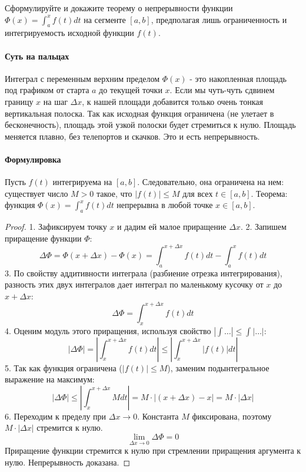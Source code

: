 
{Сформулируйте и докажите теорему о непрерывности функции $\Phi(x) = \int_a^x f(t)dt$ на сегменте $[a, b]$, предполагая лишь ограниченность и интегрируемость исходной функции $f(t)$.}

\paragraph{Суть на пальцах}
Интеграл с переменным верхним пределом $\Phi(x)$ - это накопленная площадь под графиком от старта $a$ до текущей точки $x$. Если мы чуть-чуть сдвинем границу $x$ на шаг $\Delta x$, к нашей площади добавится только очень тонкая вертикальная полоска. Так как исходная функция ограничена (не улетает в бесконечность), площадь этой узкой полоски будет стремиться к нулю. Площадь меняется плавно, без телепортов и скачков. Это и есть непрерывность.

\paragraph{Формулировка}
Пусть $f(t)$ интегрируема на $[a, b]$. Следовательно, она ограничена на нем: существует число $M > 0$ такое, что $|f(t)| \le M$ для всех $t \in [a, b]$.
Теорема: функция $\Phi(x) = \int_a^x f(t)dt$ непрерывна в любой точке $x \in [a, b]$.

\begin{proof}
1. Зафиксируем точку $x$ и дадим ей малое приращение $\Delta x$.
2. Запишем приращение функции $\Phi$:
$$ \Delta \Phi = \Phi(x+\Delta x) - \Phi(x) = \int_a^{x+\Delta x} f(t)dt - \int_a^x f(t)dt $$
3. По свойству аддитивности интеграла (разбиение отрезка интегрирования), разность этих двух интегралов дает интеграл по маленькому кусочку от $x$ до $x+\Delta x$:
$$ \Delta \Phi = \int_x^{x+\Delta x} f(t)dt $$
4. Оценим модуль этого приращения, используя свойство $| \int \dots | \le \int | \dots |$:
$$ |\Delta \Phi| = \left| \int_x^{x+\Delta x} f(t)dt \right| \le \left| \int_x^{x+\Delta x} |f(t)| dt \right| $$
5. Так как функция ограничена ($|f(t)| \le M$), заменим подынтегральное выражение на максимум:
$$ |\Delta \Phi| \le \left| \int_x^{x+\Delta x} M dt \right| = M \cdot |(x+\Delta x) - x| = M \cdot |\Delta x| $$
6. Переходим к пределу при $\Delta x \to 0$. Константа $M$ фиксирована, поэтому $M \cdot |\Delta x|$ стремится к нулю.
$$ \lim_{\Delta x \to 0} \Delta \Phi = 0 $$
Приращение функции стремится к нулю при стремлении приращения аргумента к нулю. Непрерывность доказана.
\end{proof}


